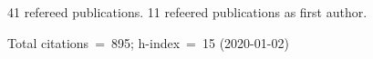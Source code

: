 41 refereed publications. 11 refeered publications as first author.

Total citations~=~895; h-index~=~15 (2020-01-02)